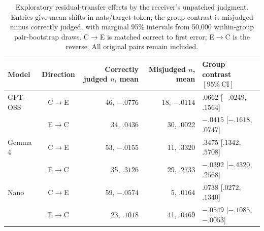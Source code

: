 \begin{table}[htbp]
\centering
\small
\setlength{\tabcolsep}{4pt}
\renewcommand{\arraystretch}{1.12}
\caption{Exploratory residual-transfer effects by the receiver's unpatched
judgment. Entries give mean shifts in nats/target-token; the group contrast is
misjudged minus correctly judged, with marginal 95\% intervals from 50,000
within-group pair-bootstrap draws. C$\rightarrow$E is matched correct to first
error; E$\rightarrow$C is the reverse. All original pairs remain included.}
\label{tab:processbench-receiver-state}
\begin{tabularx}{\textwidth}{@{}l c r r >{\centering\arraybackslash}X@{}}
\toprule
Model & Direction & \shortstack{Correctly judged\\$n$, mean} &
\shortstack{Misjudged\\$n$, mean} & \shortstack{Group contrast\\$[95\%\ \mathrm{CI}]$} \\
\midrule
GPT-OSS & C$\rightarrow$E & 46, $-.0776$ & 18, $-.0114$ & $.0662$ [$-.0249$, $.1564$] \\
        & E$\rightarrow$C & 34, $.0436$ & 30, $.0022$ & $-.0415$ [$-.1618$, $.0747$] \\
\addlinespace[3pt]
Gemma 4 & C$\rightarrow$E & 53, $-.0155$ & 11, $.3320$ & $.3475$ [$.1342$, $.5708$] \\
        & E$\rightarrow$C & 35, $.3126$ & 29, $.2733$ & $-.0392$ [$-.4320$, $.2568$] \\
\addlinespace[3pt]
Nano    & C$\rightarrow$E & 59, $-.0574$ & 5, $.0164$ & $.0738$ [$.0272$, $.1340$] \\
        & E$\rightarrow$C & 23, $.1018$ & 41, $.0469$ & $-.0549$ [$-.1085$, $-.0053$] \\
\bottomrule
\end{tabularx}
\end{table}

